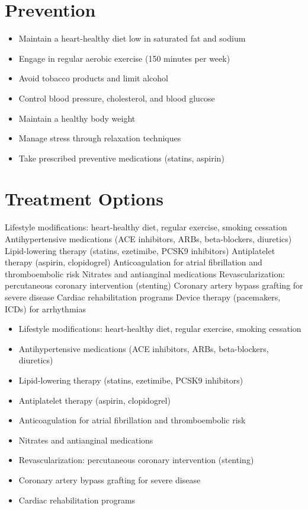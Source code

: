 \section{Prevention}
\begin{itemize}[noitemsep]
  \item Maintain a heart-healthy diet low in saturated fat and sodium
  \item Engage in regular aerobic exercise (150 minutes per week)
  \item Avoid tobacco products and limit alcohol
  \item Control blood pressure, cholesterol, and blood glucose
  \item Maintain a healthy body weight
  \item Manage stress through relaxation techniques
  \item Take prescribed preventive medications (statins, aspirin)
\end{itemize}
\section{Treatment Options}
Lifestyle modifications: heart-healthy diet, regular exercise, smoking cessation Antihypertensive medications (ACE inhibitors, ARBs, beta-blockers, diuretics) Lipid-lowering therapy (statins, ezetimibe, PCSK9 inhibitors) Antiplatelet therapy (aspirin, clopidogrel) Anticoagulation for atrial fibrillation and thromboembolic risk Nitrates and antianginal medications Revascularization: percutaneous coronary intervention (stenting) Coronary artery bypass grafting for severe disease Cardiac rehabilitation programs Device therapy (pacemakers, ICDs) for arrhythmias

\begin{itemize}[noitemsep]
  \item Lifestyle modifications: heart-healthy diet, regular exercise, smoking cessation
  \item Antihypertensive medications (ACE inhibitors, ARBs, beta-blockers, diuretics)
  \item Lipid-lowering therapy (statins, ezetimibe, PCSK9 inhibitors)
  \item Antiplatelet therapy (aspirin, clopidogrel)
  \item Anticoagulation for atrial fibrillation and thromboembolic risk
  \item Nitrates and antianginal medications
  \item Revascularization: percutaneous coronary intervention (stenting)
  \item Coronary artery bypass grafting for severe disease
  \item Cardiac rehabilitation programs
\end{itemize}

